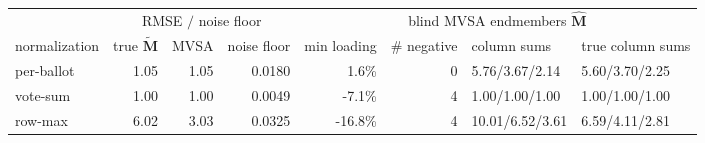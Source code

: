 \begin{tabular}{lrrrrrll}
\toprule
 & \multicolumn{3}{c}{RMSE $/$ noise floor} & \multicolumn{4}{c}{blind MVSA endmembers $\hat{\mathbf M}$} \\
\cmidrule(lr){2-4}\cmidrule(lr){5-8}
normalization & true $\tilde{\mathbf M}$ & MVSA & noise floor & min loading & \# negative & column sums & true column sums \\
\midrule
per-ballot & 1.05 & 1.05 & 0.0180 & 1.6\% & 0 & 5.76/3.67/2.14 & 5.60/3.70/2.25 \\
vote-sum & 1.00 & 1.00 & 0.0049 & -7.1\% & 4 & 1.00/1.00/1.00 & 1.00/1.00/1.00 \\
row-max & 6.02 & 3.03 & 0.0325 & -16.8\% & 4 & 10.01/6.52/3.61 & 6.59/4.11/2.81 \\
\bottomrule
\end{tabular}
